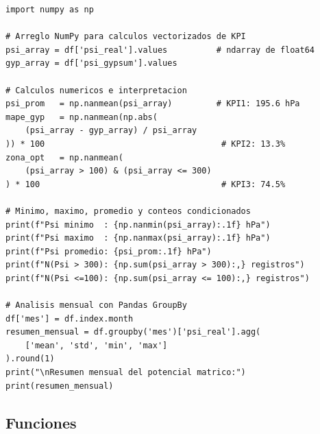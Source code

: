 \documentclass[12pt,a4paper]{article}
\begin{document}
\begin{lstlisting}[caption={Operaciones vectorizadas con NumPy y análisis con Pandas.}, label=lst:numpy]
import numpy as np

# Arreglo NumPy para calculos vectorizados de KPI
psi_array = df['psi_real'].values          # ndarray de float64
gyp_array = df['psi_gypsum'].values

# Calculos numericos e interpretacion
psi_prom   = np.nanmean(psi_array)         # KPI1: 195.6 hPa
mape_gyp   = np.nanmean(np.abs(
    (psi_array - gyp_array) / psi_array
)) * 100                                    # KPI2: 13.3%
zona_opt   = np.nanmean(
    (psi_array > 100) & (psi_array <= 300)
) * 100                                     # KPI3: 74.5%

# Minimo, maximo, promedio y conteos condicionados
print(f"Psi minimo  : {np.nanmin(psi_array):.1f} hPa")
print(f"Psi maximo  : {np.nanmax(psi_array):.1f} hPa")
print(f"Psi promedio: {psi_prom:.1f} hPa")
print(f"N(Psi > 300): {np.sum(psi_array > 300):,} registros")
print(f"N(Psi <=100): {np.sum(psi_array <= 100):,} registros")

# Analisis mensual con Pandas GroupBy
df['mes'] = df.index.month
resumen_mensual = df.groupby('mes')['psi_real'].agg(
    ['mean', 'std', 'min', 'max']
).round(1)
print("\nResumen mensual del potencial matrico:")
print(resumen_mensual)
\end{lstlisting}

\subsection{Funciones}
\end{document}
